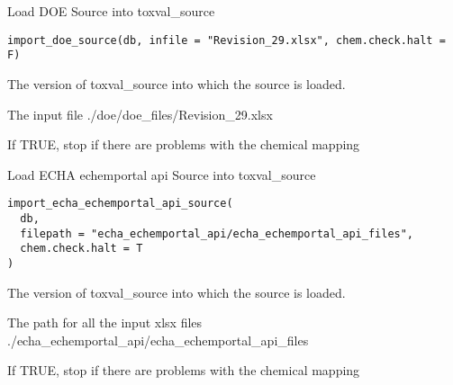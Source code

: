 \documentclass[letterpaper]{book}
\begin{document}
%
\begin{Description}\relax
Load DOE Source into toxval\_source
\end{Description}
%
\begin{Usage}
\begin{verbatim}
import_doe_source(db, infile = "Revision_29.xlsx", chem.check.halt = F)
\end{verbatim}
\end{Usage}
%
\begin{Arguments}
\begin{ldescription}
\item[\code{db}] The version of toxval\_source into which the source is loaded.

\item[\code{infile}] The input file ./doe/doe\_files/Revision\_29.xlsx

\item[\code{chem.check.halt}] If TRUE, stop if there are problems with the chemical mapping
\end{ldescription}
\end{Arguments}
%
\begin{Description}\relax
Load ECHA echemportal api Source into toxval\_source
\end{Description}
%
\begin{Usage}
\begin{verbatim}
import_echa_echemportal_api_source(
  db,
  filepath = "echa_echemportal_api/echa_echemportal_api_files",
  chem.check.halt = T
)
\end{verbatim}
\end{Usage}
%
\begin{Arguments}
\begin{ldescription}
\item[\code{db}] The version of toxval\_source into which the source is loaded.

\item[\code{filepath}] The path for all the input xlsx files ./echa\_echemportal\_api/echa\_echemportal\_api\_files

\item[\code{chem.check.halt}] If TRUE, stop if there are problems with the chemical mapping
\end{ldescription}
\end{Arguments}
\end{document}
